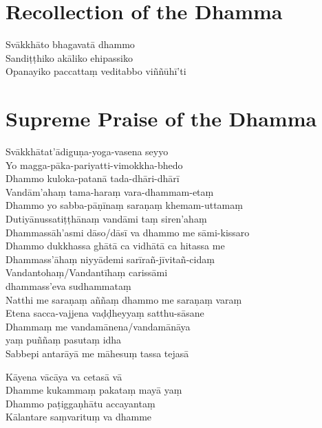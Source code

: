 \section*{Recollection of the Dhamma}

\begin{leader}
\end{leader}

Svākkhāto bhagavatā dhammo\\
Sandiṭṭhiko akāliko ehipassiko\\
Opanayiko paccattaṃ veditabbo viññūhī'ti

\section*{Supreme Praise of the Dhamma}

\begin{leader}
\end{leader}

Svākkhātat'ādiguṇa-yoga-vasena seyyo\\
Yo magga-pāka-pariyatti-vimokkha-bhedo\\
Dhammo kuloka-patanā tada-dhāri-dhārī\\
Vandām'ahaṃ tama-haraṃ vara-dhammam-etaṃ\\
Dhammo yo sabba-pāṇīnaṃ saraṇaṃ khemam-uttamaṃ\\
Dutiyānussatiṭṭhānaṃ vandāmi taṃ siren'ahaṃ\\
Dhammassāh'asmi dāso/dāsī va dhammo me sāmi-kissaro\\
Dhammo dukkhassa ghātā ca vidhātā ca hitassa me\\
Dhammass'āhaṃ niyyādemi sarīrañ-jīvitañ-cidaṃ\\
Vandantohaṃ/Vandantīhaṃ carissāmi\\
\vin dhammass'eva sudhammataṃ\\
Natthi me saraṇaṃ aññaṃ dhammo me saraṇaṃ varaṃ\\
Etena sacca-vajjena vaḍḍheyyaṃ satthu-sāsane\\
Dhammaṃ me vandamānena/vandamānāya\\
\vin yaṃ puññaṃ pasutaṃ idha\\
Sabbepi antarāyā me māhesuṃ tassa tejasā

\enlargethispage{\baselineskip}


Kāyena vācāya va cetasā vā\\
Dhamme kukammaṃ pakataṃ mayā yaṃ\\
Dhammo paṭiggaṇhātu accayantaṃ\\
Kālantare saṃvarituṃ va dhamme

